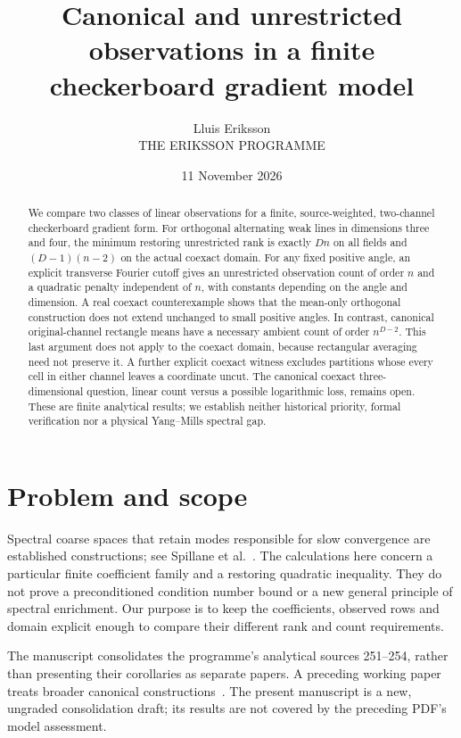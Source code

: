 \documentclass[11pt,a4paper]{article}
\title{Canonical and unrestricted observations in a finite checkerboard gradient model}
\author{Lluis Eriksson\\\small THE ERIKSSON PROGRAMME}
\date{11 November 2026}
\begin{document}
\maketitle
\begin{abstract}
We compare two classes of linear observations for a finite, source-weighted,
two-channel checkerboard gradient form. For orthogonal alternating weak lines
in dimensions three and four, the minimum restoring unrestricted rank is
exactly $Dn$ on all fields and $(D-1)(n-2)$ on the actual coexact domain.
For any fixed positive angle, an explicit transverse Fourier cutoff gives
an unrestricted observation count of order $n$ and a quadratic penalty
independent of $n$, with constants depending on the angle and dimension.
A real coexact counterexample shows that the mean-only orthogonal construction
does not extend unchanged to small positive angles. In contrast, canonical
original-channel rectangle means have a necessary ambient count of order
$n^{D-2}$. This last argument does not apply to the coexact domain, because
rectangular averaging need not preserve it. A further explicit coexact witness
excludes partitions whose every cell in either channel leaves a coordinate
uncut. The canonical coexact three-dimensional question, linear count versus
a possible logarithmic loss, remains open. These are finite analytical results;
we establish neither historical priority, formal verification nor a physical
Yang--Mills spectral gap.
\end{abstract}

\section{Problem and scope}
Spectral coarse spaces that retain modes responsible for slow convergence are
established constructions; see Spillane et al.~\cite{spillane2011,spillane2014}.
The calculations here concern a particular finite coefficient family and a
restoring quadratic inequality. They do not prove a preconditioned condition
number bound or a new general principle of spectral enrichment. Our purpose is
to keep the coefficients, observed rows and domain explicit enough to compare
their different rank and count requirements.

The manuscript consolidates the programme's analytical sources 251--254,
rather than presenting their corollaries as separate papers. A preceding
working paper treats broader canonical constructions~\cite{eriksson250}.
The present manuscript is a new, ungraded consolidation draft; its results
are not covered by the preceding PDF's model assessment.
\end{document}

